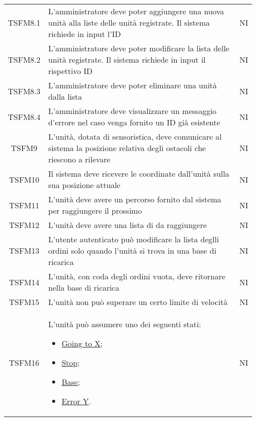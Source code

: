 \begin{longtable}[h!] { c  m{12cm} c}
		TSFM8.1 & L'amministratore deve poter aggiungere una nuova unità alla liste delle unità registrate. Il sistema richiede in input l'ID & NI\\	
		
		TSFM8.2 & 	L'amministratore deve poter modificare la lista delle unità registrate. Il sistema richiede in input il rispettivo ID & NI\\
		
		TSFM8.3 & L'amministratore deve poter eliminare una unità dalla lista & NI\\
		
		TSFM8.4  & L'amministratore deve visualizzare un messaggio d'errore nel caso venga fornito un ID già esistente & NI \\
		
		TSFM9   & L'unità, dotata di sensoristica, deve comunicare al sistema la posizione relativa degli ostacoli che riescono a rilevare & NI \\
		
		TSFM10 & Il sistema deve ricevere le coordinate dall'unità sulla sua posizione attuale & NI \\
		
		TSFM11 & L'unità deve avere un percorso fornito dal sistema per raggiungere il prossimo \glock{POI} & NI \\
		
		TSFM12 & L'unità deve avere una lista di \glock{POI} da raggiungere & NI \\
		
		TSFM13  & L'utente autenticato può modificare la lista deglli ordini solo quando l'unità si trova in una base di ricarica & NI \\
		
		TSFM14  & L'unità, con coda degli ordini vuota, deve ritornare nella base di ricarica & NI \\
		
		TSFM15  & L'unità non può superare un certo limite di velocità & NI \\
		
		TSFM16 & L'unità può assumere uno dei seguenti stati:
				\begin{itemize}
					\item \underline{Going to X};
					\item \underline{Stop};
					\item \underline{Base};
					\item \underline{Error Y}.
				\end{itemize}		
										& NI \\
										

\end{longtable}
